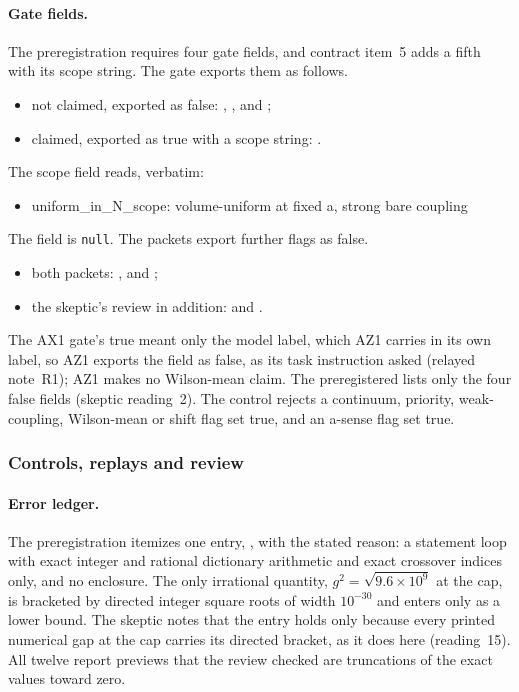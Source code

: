 \paragraph{Gate fields.}
The preregistration requires four gate fields, and contract item~5 adds a
fifth with its scope string. The gate exports them as follows.
\begin{itemize}\raggedright
\item not claimed, exported as false: ,
 ,  and
 ;
\item claimed, exported as true with a scope string:
 .
\end{itemize}
The scope field reads, verbatim:
\begin{gatequote}
\begin{itemize}
\item uniform\_in\_N\_scope: volume-uniform at fixed a, strong bare coupling
\end{itemize}
\end{gatequote}
The  field is \texttt{null}. The packets export further
flags as false.
\begin{itemize}\raggedright
\item both packets: ,
  and
 ;
\item the skeptic's review in addition:  and
 .
\end{itemize}
The AX1 gate's  true meant only the model label,
which AZ1 carries in its own label, so AZ1 exports the field as false, as its
task instruction asked (relayed note~R1); AZ1 makes no Wilson-mean claim. The
preregistered  lists only the four false fields
(skeptic reading~2). The control 
rejects a continuum, priority, weak-coupling, Wilson-mean or shift flag set
true, and an a-sense flag set true.

\subsubsection{Controls, replays and review}
\label{sec:az1-evidence}
\paragraph{Error ledger.}
The preregistration itemizes one entry, , with the
stated reason: a statement loop with exact integer and rational dictionary
arithmetic and exact crossover indices only, and no enclosure. The only
irrational quantity, $g^2=\sqrt{9.6\times10^9}$ at the cap, is bracketed by
directed integer square roots of width $10^{-30}$ and enters only as a lower
bound. The skeptic notes that the entry holds only because every printed
numerical gap at the cap carries its directed bracket, as it does here
(reading~15). All twelve report previews that the review checked are
truncations of the exact values toward zero.

